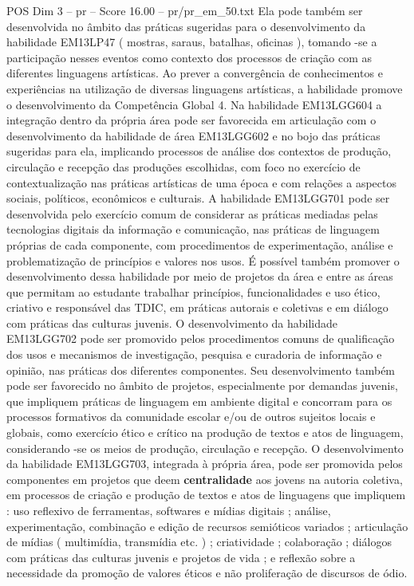 \begin{textsample}{POS Dim 3 – pr – Score 16.00 – pr/pr\_em\_50.txt}
Ela pode também ser desenvolvida no âmbito das práticas sugeridas para o desenvolvimento da habilidade EM13LP47 ( mostras, saraus, batalhas, oficinas ), tomando -se a participação nesses eventos como contexto dos processos de criação com as diferentes linguagens artísticas.
Ao prever a convergência de conhecimentos e experiências na utilização de diversas linguagens artísticas, a habilidade promove o desenvolvimento da Competência Global 4.
Na habilidade EM13LGG604 a integração dentro da própria área pode ser favorecida em articulação com o desenvolvimento da habilidade de área EM13LGG602 e no bojo das práticas sugeridas para ela, implicando processos de análise dos contextos de produção, circulação e recepção das produções escolhidas, com foco no exercício de contextualização nas práticas artísticas de uma época e com relações a aspectos sociais, políticos, econômicos e culturais.
A habilidade EM13LGG701 pode ser desenvolvida pelo exercício comum de considerar as práticas mediadas pelas tecnologias digitais da informação e comunicação, nas práticas de linguagem próprias de cada componente, com procedimentos de experimentação, análise e problematização de princípios e valores nos usos.
É possível também promover o desenvolvimento dessa habilidade por meio de projetos da área e entre as áreas que permitam ao estudante trabalhar princípios, funcionalidades e uso ético, criativo e responsável das TDIC, em práticas autorais e coletivas e em diálogo com práticas das culturas juvenis.
O desenvolvimento da habilidade EM13LGG702 pode ser promovido pelos procedimentos comuns de qualificação dos usos e mecanismos de investigação, pesquisa e curadoria de informação e opinião, nas práticas dos diferentes componentes.
Seu desenvolvimento também pode ser favorecido no âmbito de projetos, especialmente por demandas juvenis, que impliquem práticas de linguagem em ambiente digital e concorram para os processos formativos da comunidade escolar e/ou de outros sujeitos locais e globais, como exercício ético e crítico na produção de textos e atos de linguagem, considerando -se os meios de produção, circulação e recepção.
O desenvolvimento da habilidade EM13LGG703, integrada à própria área, pode ser promovida pelos componentes em projetos que deem \textbf{centralidade} aos jovens na autoria coletiva, em processos de criação e produção de textos e atos de linguagens que impliquem : uso reflexivo de ferramentas, softwares e mídias digitais ; análise, experimentação, combinação e edição de recursos semióticos variados ; articulação de mídias ( multimídia, transmídia etc. ) ; criatividade ; colaboração ; diálogos com práticas das culturas juvenis e projetos de vida ; e reflexão sobre a necessidade da promoção de valores éticos e não proliferação de discursos de ódio.

\end{textsample}
